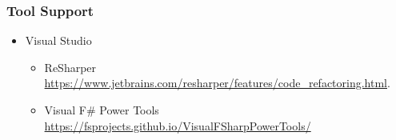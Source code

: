 \begin{frame}

\frametitle{Tool Support}

\begin{itemize}

\item Visual Studio

\begin{itemize}

\item ReSharper \url{https://www.jetbrains.com/resharper/features/code_refactoring.html}.

\item Visual F\# Power Tools
\url{https://fsprojects.github.io/VisualFSharpPowerTools/}

\end{itemize}

\end{itemize}

\end{frame}
